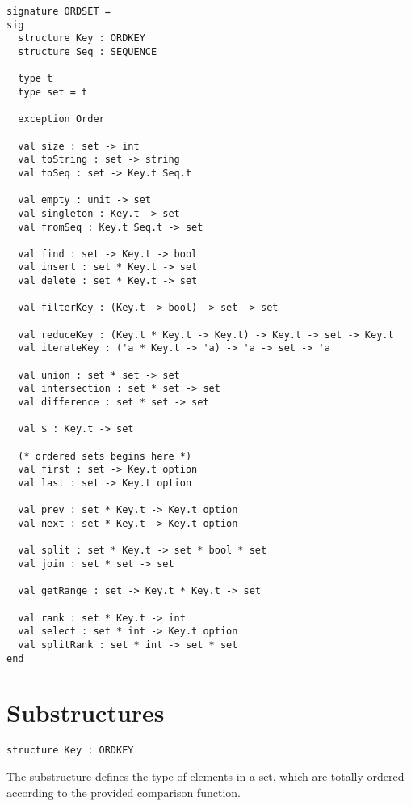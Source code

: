 \begin{cluster}
\label{grp:grm:ordset-interface::signature}

\begin{gram}
\label{grm:ordset-interface::signature}
\begin{verbatim}
signature ORDSET =
sig
  structure Key : ORDKEY
  structure Seq : SEQUENCE

  type t
  type set = t

  exception Order

  val size : set -> int
  val toString : set -> string
  val toSeq : set -> Key.t Seq.t

  val empty : unit -> set
  val singleton : Key.t -> set
  val fromSeq : Key.t Seq.t -> set

  val find : set -> Key.t -> bool
  val insert : set * Key.t -> set
  val delete : set * Key.t -> set

  val filterKey : (Key.t -> bool) -> set -> set

  val reduceKey : (Key.t * Key.t -> Key.t) -> Key.t -> set -> Key.t
  val iterateKey : ('a * Key.t -> 'a) -> 'a -> set -> 'a

  val union : set * set -> set
  val intersection : set * set -> set
  val difference : set * set -> set

  val $ : Key.t -> set

  (* ordered sets begins here *)
  val first : set -> Key.t option
  val last : set -> Key.t option

  val prev : set * Key.t -> Key.t option
  val next : set * Key.t -> Key.t option

  val split : set * Key.t -> set * bool * set
  val join : set * set -> set

  val getRange : set -> Key.t * Key.t -> set

  val rank : set * Key.t -> int
  val select : set * int -> Key.t option
  val splitRank : set * int -> set * set
end
\end{verbatim}

\end{gram}
\end{cluster}


\section{Substructures}
\label{sec:ordset-interface::substructures}

\begin{cluster}
\label{grp:grm:ordset-interface::structure}

\begin{gram}
\label{grm:ordset-interface::structure}
\begin{verbatim}
structure Key : ORDKEY
\end{verbatim}
The  substructure defines the type of elements in a set, which are
totally ordered according to the provided comparison function.

\end{gram}
\end{cluster}

